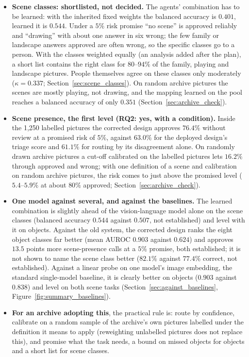 \documentclass[12pt,a4paper]{report}
\begin{document}
\begin{itemize}
    \item \textbf{Scene classes: shortlisted, not decided.} The agents' combination has to be learned: with the inherited fixed weights the balanced accuracy is $0.401$, learned it is $0.544$. Under a $5\%$ risk promise ``no scene'' is approved reliably and ``drawing'' with about one answer in six wrong; the few family or landscape answers approved are often wrong, so the specific classes go to a person. With the classes weighted equally (an analysis added after the plan), a short list contains the right class for $80$--$94\%$ of the family, playing and landscape pictures. People themselves agree on these classes only moderately ($\kappa = 0.337$; Section~\ref{sec:scene_classes}). On random archive pictures the scenes are mostly playing, not drawing, and the mapping learned on the pool reaches a balanced accuracy of only $0.351$ (Section~\ref{sec:archive_check}).
    \item \textbf{Scene presence, the first level (RQ2: yes, with a condition).} Inside the 1,250 labelled pictures the corrected design approves $76.4\%$ without review at a promised risk of $5\%$, against $63.0\%$ for the deployed design's triage score and $61.1\%$ for routing by its disagreement alone. On randomly drawn archive pictures a cut-off calibrated on the labelled pictures lets $16.2\%$ through approved and wrong; with one definition of a scene and calibration on random archive pictures, the risk comes to just above the promised level ($5.4$--$5.9\%$ at about $80\%$ approved; Section~\ref{sec:archive_check}).
    \item \textbf{One model against several, and against the baselines.} The learned combination is slightly ahead of the vision-language model alone on the scene classes (balanced accuracy $0.544$ against $0.507$, not established) and level with it on objects. Against the old system, the corrected design ranks the eight object classes far better (mean AUROC $0.903$ against $0.624$) and approves $13.5$ points more scene-presence calls at a $5\%$ promise, both established; it is not shown to name the scene class better ($82.1\%$ against $77.4\%$ correct, not established). Against a linear probe on one model's image embedding, the standard single-model baseline, it is clearly better on objects ($0.903$ against $0.838$) and level on both scene tasks (Section~\ref{sec:against_baselines}, Figure~\ref{fig:summary_baselines}).
    \item \textbf{For an archive adopting this}, the practical rule is: route by confidence, calibrate on a random sample of the archive's own pictures labelled under the definition it means to apply (reweighting unlabelled pictures does not replace this), and promise what the task needs, a bound on missed objects for objects and a short list for scene classes.
\end{itemize}
\end{document}
